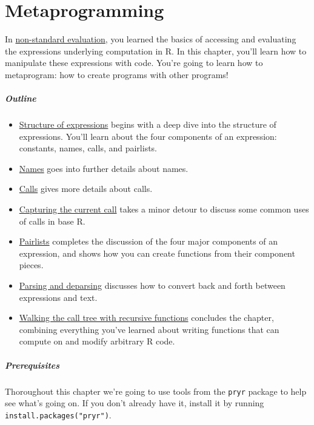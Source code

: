 \chapter{Metaprogramming}\label{metaprogramming}

In \hyperref[nse]{non-standard evaluation}, you learned the basics of
accessing and evaluating the expressions underlying computation in R. In
this chapter, you'll learn how to manipulate these expressions with
code. You're going to learn how to metaprogram: how to create programs
with other programs! 

\paragraph{Outline}

\begin{itemize}
\item
  \hyperref[structure-of-expressions]{Structure of expressions} begins
  with a deep dive into the structure of expressions. You'll learn about
  the four components of an expression: constants, names, calls, and
  pairlists.
\item
  \hyperref[names]{Names} goes into further details about names.
\item
  \hyperref[calls]{Calls} gives more details about calls.
\item
  \hyperref[capturing-call]{Capturing the current call} takes a minor
  detour to discuss some common uses of calls in base R.
\item
  \hyperref[pairlists]{Pairlists} completes the discussion of the four
  major components of an expression, and shows how you can create
  functions from their component pieces.
\item
  \hyperref[parsing-and-deparsing]{Parsing and deparsing} discusses how
  to convert back and forth between expressions and text.
\item
  \hyperref[ast-funs]{Walking the call tree with recursive functions}
  concludes the chapter, combining everything you've learned about
  writing functions that can compute on and modify arbitrary R code.
\end{itemize}

\paragraph{Prerequisites}

Thoroughout this chapter we're going to use tools from the \texttt{pryr}
package to help see what's going on. If you don't already have it,
install it by running \texttt{install.packages("pryr")}.

